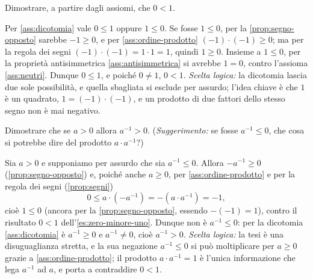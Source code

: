 \begin{esercizio}\label{es:zero-minore-uno}
Dimostrare, a partire dagli assiomi, che $0<1$.
\begin{soluzione}
Per \ref{ass:dicotomia} vale $0\le1$ oppure $1\le0$. Se fosse $1\le0$, per la
\cref{prop:segno-opposto} sarebbe $-1\ge0$, e per \ref{ass:ordine-prodotto}
$(-1)\cdot(-1)\ge0$; ma per la regola dei segni $(-1)\cdot(-1)=1\cdot1=1$, quindi
$1\ge0$. Insieme a $1\le0$, per la proprietà antisimmetrica \ref{ass:antisimmetrica} si
avrebbe $1=0$, contro l'assioma \ref{ass:neutri}. Dunque $0\le1$, e poiché $0\neq1$,
$0<1$. \emph{Scelta logica:} la dicotomia lascia due sole possibilità, e quella sbagliata
si esclude per assurdo; l'idea chiave è che $1$ è un quadrato, $1=(-1)\cdot(-1)$, e un
prodotto di due fattori dello stesso segno non è mai negativo.
\end{soluzione}
\end{esercizio}

\begin{esercizio}\label{es:inverso-positivo}
Dimostrare che se $a>0$ allora $a^{-1}>0$. (\emph{Suggerimento:} se fosse $a^{-1}\le0$,
che cosa si potrebbe dire del prodotto $a\cdot a^{-1}$?)
\begin{soluzione}
Sia $a>0$ e supponiamo per assurdo che sia $a^{-1}\le0$. Allora $-a^{-1}\ge0$
(\cref{prop:segno-opposto}) e, poiché anche $a\ge0$, per \ref{ass:ordine-prodotto} e per
la regola dei segni (\cref{prop:segni})
\[
  0\le a\cdot(-a^{-1})=-(a\cdot a^{-1})=-1 ,
\]
cioè $1\le0$ (ancora per la \cref{prop:segno-opposto}, essendo $-(-1)=1$), contro il
risultato $0<1$ dell'\cref{es:zero-minore-uno}. Dunque non è $a^{-1}\le0$: per la
dicotomia \ref{ass:dicotomia} è $a^{-1}\ge0$ e $a^{-1}\neq0$, cioè $a^{-1}>0$.
\emph{Scelta logica:} la tesi è una disuguaglianza stretta, e la sua negazione
$a^{-1}\le0$ si può moltiplicare per $a\ge0$ grazie a \ref{ass:ordine-prodotto}; il
prodotto $a\cdot a^{-1}=1$ è l'unica informazione che lega $a^{-1}$ ad $a$, e porta a
contraddire $0<1$.
\end{soluzione}
\end{esercizio}
